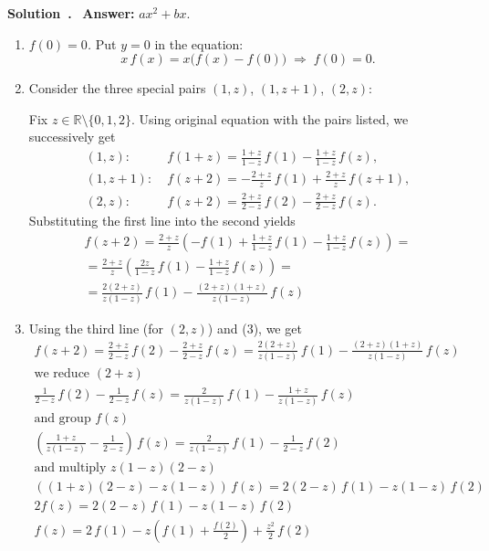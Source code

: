 \documentclass[a4paper,12pt]{article}
\newenvironment{solution}[1][]{%
  \goodbreak\smallskip\par\noindent\textbf{Solution{\if#1\empty\else~#1\fi}.}~}%
{%
  \goodbreak
}
\begin{document}

\begin{solution}
\textbf{Answer:} \(ax^{2}+bx\).

  \begin{enumerate}
  \item \emph{$f(0)=0$.}  Put $y=0$ in the equation:
        \[
        x\,f(x)=x\bigl(f(x)-f(0)\bigr)\;\Longrightarrow\;f(0)=0.
        \]

  \item Consider the three special pairs $(1,z)$, $(1,z+1)$, $(2,z)$:

  Fix $z\in\mathbb{R}\setminus\{0,1,2\}$.
  Using original equation with the pairs listed, we successively get
  \begin{align*}
  (1,z):\;& f(1+z)=\frac{1+z}{1-z}\,f(1)-\frac{1+z}{1-z}\,f(z),\\[4pt]
  (1,z+1):\;& f(z+2)=-\frac{2+z}{z}\,f(1)+\frac{2+z}{z}\,f(z+1),\\[4pt]
  (2,z):\;& f(z+2)=\frac{2+z}{2-z}\,f(2)-\frac{2+z}{2-z}\,f(z).
  \end{align*}
  Substituting the first line into the second yields
  \begin{align*}
  f(z+2) = \frac{2+z}{z} \left(-f(1) + \frac{1+z}{1-z}\,f(1)-\frac{1+z}{1-z}\,f(z) \right) = \\[4pt]
  = \frac{2+z}{z} \left(\frac{2z}{1-z}\,f(1)  - \frac{1+z}{1-z}\,f(z) \right) = \\[4pt]
  = \frac{2(2+z)}{z(1-z)}\,f(1) - \frac{(2+z)(1+z)}{z(1-z)}\,f(z) \tag{3}
  \end{align*}

  \item Using the third line (for \((2, z)\)) and (3), we get
  \begin{align*}
  f(z+2) = \frac{2+z}{2-z}\,f(2)-\frac{2+z}{2-z}\,f(z) =
  \frac{2(2+z)}{z(1-z)}\,f(1) - \frac{(2+z)(1+z)}{z(1-z)}\,f(z) \\[4pt]
  \text{we reduce \((2+z)\)} \\[4pt]
  \frac{1}{2-z}\,f(2)-\frac{1}{2-z}\,f(z) =
  \frac{2}{z(1-z)}\,f(1) - \frac{1+z}{z(1-z)}\,f(z) \\[4pt]
  \text{and group \(f(z)\)} \\[4pt]
  \left( \frac{1+z}{z(1-z)} -\frac{1}{2-z} \right)\,f(z) =
  \frac{2}{z(1-z)}\,f(1) - \frac{1}{2-z}\,f(2) \\[4pt]
  \text{and multiply \(z(1-z)(2-z)\)} \\[4pt]
  \left( (1+z)(2-z) - z(1-z) \right)\,f(z) = 2(2-z)\,f(1) - z(1-z)\,f(2) \\[4pt]
  2 f(z) = 2(2-z)\,f(1) - z(1-z)\,f(2) \\[4pt]
    f(z) = 2\,f(1) - z \left( f(1) + \frac{f(2)}{2} \right) + \frac{z^2}{2}\,f(2)
  \end{align*}


\end{enumerate}
\end{solution}
\end{document}
